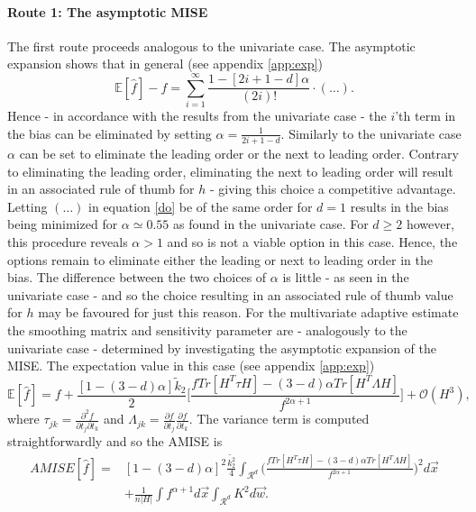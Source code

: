 \paragraph{Route 1: The asymptotic MISE}
The first route proceeds analogous to the univariate case. The asymptotic expansion shows that in general (see appendix \ref{app:exp})
\begin{equation}
	\mathbb{E}[\hat{f}]-f=\sum_{i=1}^{\infty}\frac{1-[2i+1-d]\alpha}{(2i)!}\cdot (\dots).
	\label{do}
\end{equation}
Hence - in accordance with the results from the univariate case - the $i$'th term in the bias can be eliminated by setting $\alpha=\frac{1}{2i+1-d}$. Similarly to the univariate case $\alpha$ can be set to eliminate the leading order or the next to leading order. Contrary to eliminating the leading order, eliminating the next to leading order will result in an associated rule of thumb for $h$ - giving this choice a competitive advantage. Letting $(\dots)$ in equation \eqref{do} be of the same order for $d=1$ results in the bias being minimized for $\alpha\simeq 0.55$ as found in the univariate case. For $d\geq 2$ however, this procedure reveals $\alpha>1$ and so is not a viable option in this case. Hence, the options remain to eliminate either the leading or next to leading order in the bias. The difference between the two choices of $\alpha$ is little - as seen in the univariate case - and so the choice resulting in an associated rule of thumb value for $h$ may be favoured for just this reason.\newline\newline
\noindent For the multivariate adaptive estimate the smoothing matrix and sensitivity parameter are - analogously to the univariate case - determined by investigating the asymptotic expansion of the MISE. The expectation value in this case (see appendix \ref{app:exp})
\begin{equation}
	\mathbb{E}[\hat{f}]=f+\frac{[1-(3-d)\alpha]\tilde{k}_2}{2}\bigg[\frac{fTr[H^T\tau H]-(3-d)\alpha Tr[H^T\Lambda H]}{f^{2\alpha+1}}\bigg]+\mathcal{O}(H^3),
\end{equation}
where $\tau_{jk}=\frac{\partial^2 f}{\partial t_j\partial t_k}$ and $\Lambda_{jk}=\frac{\partial f}{\partial t_j}\frac{\partial f}{\partial t_k}$. The variance term is computed straightforwardly and so the AMISE is
\begin{equation}
	\begin{split}
		AMISE[\hat{f}]=& [1-(3-d)\alpha]^2\frac{\tilde{k_2^2}}{4}\int_{\mathcal{R}^d} \bigg(\frac{fTr[H^T\tau H]-(3-d)\alpha Tr[H^T\Lambda H]}{f^{2\alpha+1}}\bigg)^2d\vec{x}\\
		&+\frac{1}{n|H|}\int f^{\alpha+1}d\vec{x}  \int_{\mathcal{R}^d} K^2d\vec{w}.
	\end{split}
	\label{mise4}
\end{equation}
